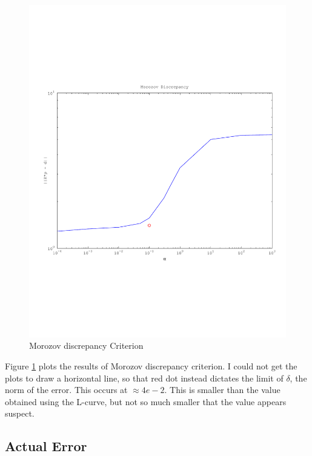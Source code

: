 \documentclass{article}
\begin{document}
\begin{figure}[!htb]
  \includegraphics[scale=.5]{plots/morozov.pdf}
  \caption{Morozov discrepancy Criterion} 
 \label{fig:moro}
\end{figure}

Figure \ref{fig:moro} plots the results of Morozov discrepancy
criterion. I could not get the plots to draw a horizontal line, so that
red dot instead dictates the limit of $\delta$, the norm of the
error. This occurs at $\approx 4e-2$. This is smaller than the value
obtained using the L-curve, but not so much smaller that the value
appears suspect. 


\subsection{Actual Error}
\end{document}
